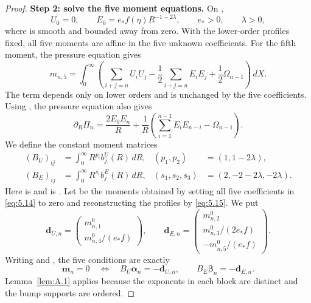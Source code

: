\begin{proof}
\textbf{Step 2: solve the five moment equations.} On ,
\[
U_0=0,
\qquad
E_0=e_*f(\eta)R^{-1-2\lambda},
\qquad
e_*>0,
\qquad
\lambda>0,
\]
where  is smooth and bounded away from zero. With the lower-order profiles fixed, all five moments are
affine in the five unknown coefficients. For the fifth moment, the pressure equation gives
\[
m_{n,5}=\int_0^\infty\left(
\sum_{i+j=n}U_iU_j
-\frac12\sum_{i+j=n}E_iE_j
+\frac12\Omega_{n-1}
\right)\,dX.
\]
The term  depends only on lower orders and is unchanged by the five coefficients. Using
, the pressure equation also gives
\[
\partial_R\Pi_n
=\frac{2E_0E_n}{R}
+\frac1R\left(\sum_{i=1}^{n-1}E_iE_{n-i}-\Omega_{n-1}\right).
\]
We define the constant moment matrices
\[
\begin{aligned}
(B_U)_{ij}&=\int_0^\infty R^{p_i}b_j^U(R)\,dR,
& (p_1,p_2)&=(1,1-2\lambda),\\
(B_E)_{ij}&=\int_0^\infty R^{s_i}b_j^E(R)\,dR,
& (s_1,s_2,s_3)&=(2,-2-2\lambda,-2\lambda).
\end{aligned}
\]
%
Here  is  and  is
. Let  be the moments obtained by setting all five coefficients in
\eqref{eq:5.14} to zero and reconstructing the profiles by \eqref{eq:5.15}. We put
\[
\mathbf d_{U,n}
=\begin{pmatrix}
m_{n,1}^0\\[2pt]
m_{n,4}^0/(e_*f)
\end{pmatrix},
\qquad
\mathbf d_{E,n}
=\begin{pmatrix}
m_{n,2}^0\\[2pt]
m_{n,3}^0/(2e_*f)\\[2pt]
-m_{n,5}^0/(e_*f)
\end{pmatrix}.
\]
Writing  and
, the five conditions are exactly
\[
\mathbf m_n=0
\quad\Longleftrightarrow\quad
B_U\boldsymbol\alpha_n=-\mathbf d_{U,n},
\qquad
B_E\boldsymbol\beta_n=-\mathbf d_{E,n}.
\]
Lemma~\ref{lem:A.1} applies because the exponents in each block are distinct and the bump supports are ordered.

\end{proof}
